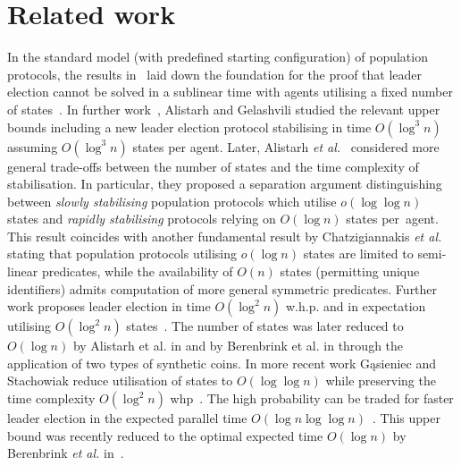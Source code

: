 \section{Related work}
%
In the standard model (with predefined starting configuration) of population protocols, the results in~\cite{DBLP:conf/wdag/ChenCDS14, DBLP:conf/soda/Doty14} laid down the foundation for the proof that leader election cannot be solved in a sublinear time with agents utilising a fixed number of states~\cite{DS18}.
In further work~\cite{DBLP:conf/icalp/AlistarhG15}, Alistarh and Gelashvili studied the relevant upper bounds including 
a new leader election protocol stabilising in time $O(\log^3 n)$ assuming $O(\log^3 n)$ states per agent.
%
Later, Alistarh {\em et al.}~\cite{DBLP:conf/soda/AlistarhAEGR17} considered more general trade-offs between the number of states and the time complexity of stabilisation.
%
In particular, they proposed a separation argument distinguishing between {\em slowly stabilising} population protocols 
which utilise $o(\log\log n)$ states and {\em rapidly stabilising} protocols relying on $O(\log n)$ states per~agent. 
This result coincides with another fundamental result by Chatzigiannakis {\em et al.}~\cite{DBLP:journals/tcs/ChatzigiannakisMNPS11} 
stating that population protocols utilising $o(\log n)$ states are limited to semi-linear predicates,
while the availability of $O(n)$ states (permitting unique identifiers) admits computation of more general symmetric predicates.
%
Further work proposes leader election in time 
$O(\log^2 n)$ w.h.p. and in expectation utilising $O(\log^2 n)$ states~\cite{DBLP:conf/podc/BilkeCER17}. 
The number of states was later reduced to $O(\log n)$ by
Alistarh et al. in \cite{DBLP:conf/soda/AlistarhAG18} and by Berenbrink et al. in \cite{DBLP:conf/soda/BerenbrinkKKO18} through the application of two types of synthetic coins.
%
In more recent work G\k asieniec and Stachowiak reduce utilisation of states to $O(\log\log n)$ while preserving the time complexity $O(\log^2 n)$ whp~\cite{DBLP:journals/jacm/GasieniecS21}.
The high probability can be traded for faster leader election in the expected parallel time $O(\log n\log\log n)$~\cite{DBLP:conf/spaa/GasieniecSU19}. This upper bound was recently reduced to the optimal expected time $O(\log n)$ by Berenbrink {\em et al.} in~\cite{DBLP:conf/stoc/BerenbrinkGK20}. 

